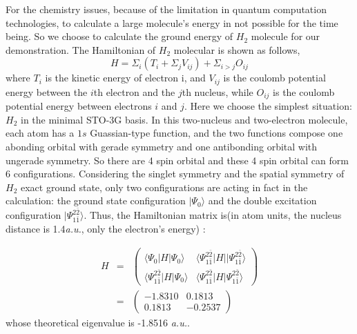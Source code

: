 \documentclass[twocolumn,showpacs,twoside,10pt,superscriptaddress,prl]{revtex4}
\begin{document}
For the chemistry issues, because of the limitation in quantum
computation technologies, to calculate a large molecule's energy in
not possible for the time being. So we choose to calculate the
ground energy of $H_2$ molecule for our demonstration. The
Hamiltonian of $H_2$ molecular is shown as follows,
$$
    H=\Sigma_i(T_i+\Sigma_j{V_{ij}})+\Sigma_{i>j}{O_{ij}}
$$
where $T_i$ is the kinetic energy of electron i, and $V_{ij}$ is the
coulomb potential energy between the $i$th electron and the $j$th
nucleus, while $O_{ij}$ is the coulomb potential energy between
electrons $i$ and $j$. Here we choose the simplest situation: $H_2$
in the minimal STO-3G basis. In this two-nucleus and two-electron
molecule, each atom has a $1s$ Guassian-type function, and the two
functions compose one abonding orbital with gerade symmetry and one
antibonding orbital with ungerade symmetry. So there are 4 spin
orbital and these 4 spin orbital can form 6 configurations.
Considering the singlet symmetry and the spatial symmetry of $H_2$
exact ground state, only two configurations are acting in fact in
the calculation: the ground state configuration $|\Psi_0\rangle$ and
the double excitation configuration
$|\Psi_{1\bar{1}}^{2\bar{2}}\rangle$. Thus, the Hamiltonian matrix
is(in atom units, the nucleus distance is 1.4\emph{a.u.}, only the
electron's energy) :\cite{quantchemistry}


\begin{eqnarray}
        H&=&
        \begin{pmatrix}
            \langle\Psi_0|H|\Psi_0\rangle & \langle\Psi_{1\bar{1}}^{2\bar{2}}|H||\Psi_{1\bar{1}}^{2\bar{2}}\rangle\\
            \langle\Psi_{1\bar{1}}^{2\bar{2}}|H|\Psi_0\rangle & \langle\Psi_{1\bar{1}}^{2\bar{2}}|H|\Psi_{1\bar{1}}^{2\bar{2}}\rangle
            \end{pmatrix}\nonumber\\
        &=& \begin{pmatrix}
            -1.8310 & 0.1813\\
            0.1813 & -0.2537
            \end{pmatrix}
\end{eqnarray}
whose theoretical eigenvalue is -1.8516 \emph{a.u.}.
\end{document}
